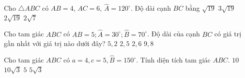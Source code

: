 \begin{ex}%
	Cho $\triangle A B C$ có $A B=4$, $A C=6$, $\widehat{A}=120^{\circ}$. Độ dài cạnh $B C$ bằng
	\choice
	{$\sqrt{19}$}
	{$3 \sqrt{19}$}
	{\True $2 \sqrt{19}$}
	{$2 \sqrt{7}$}
\end{ex}

\begin{ex}%
	Cho tam giác $A B C$ có $A B=5 ; \widehat{A}=30^{\circ}; \widehat{B}=70^{\circ}$. Độ dài của cạnh $B C$ có giá trị gần nhất với giá trị nào dưới đây?
	\choice
	{$ 5,2  $}
	{\True$ 2,5  $}
	{$ 2,6  $}
	{$ 9,8  $}
\end{ex}

\begin{ex}%
	Cho tam giác $A B C$ có $a=4, c=5, \widehat{B}=150^{\circ}$. Tính diện tích tam giác $A B C$.
	\choice
	{$ 10  $}
	{$10 \sqrt{3}$}
	{\True $ 5  $}
	{$5 \sqrt{3}$}
\end{ex}

